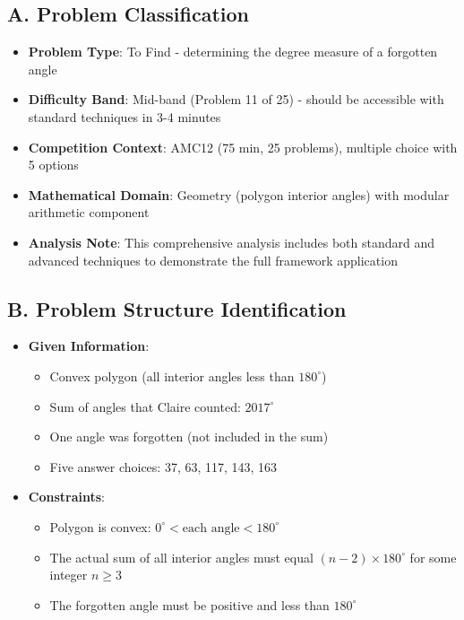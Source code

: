\documentclass[]{article}
\begin{document}
\begin{problemconfigbox}
\subsection*{A. Problem Classification}
\begin{itemize}[leftmargin=*]
    \item \textbf{Problem Type}: To Find - determining the degree measure of a forgotten angle
    \item \textbf{Difficulty Band}: Mid-band (Problem 11 of 25) - should be accessible with standard techniques in 3-4 minutes
    \item \textbf{Competition Context}: AMC12 (75 min, 25 problems), multiple choice with 5 options
    \item \textbf{Mathematical Domain}: Geometry (polygon interior angles) with modular arithmetic component
    \item \textbf{Analysis Note}: This comprehensive analysis includes both standard and advanced techniques to demonstrate the full framework application
\end{itemize}

\subsection*{B. Problem Structure Identification}
\begin{itemize}[leftmargin=*]
    \item \textbf{Given Information}: 
    \begin{itemize}
        \item Convex polygon (all interior angles less than $180^\circ$)
        \item Sum of angles that Claire counted: $2017^\circ$
        \item One angle was forgotten (not included in the sum)
        \item Five answer choices: 37, 63, 117, 143, 163
    \end{itemize}
    
    \item \textbf{Constraints}: 
    \begin{itemize}
        \item Polygon is convex: $0^\circ < \text{each angle} < 180^\circ$
        \item The actual sum of all interior angles must equal $(n-2) \times 180^\circ$ for some integer $n \geq 3$
        \item The forgotten angle must be positive and less than $180^\circ$
    \end{itemize}
    

\end{itemize}
\end{problemconfigbox}
\end{document}
